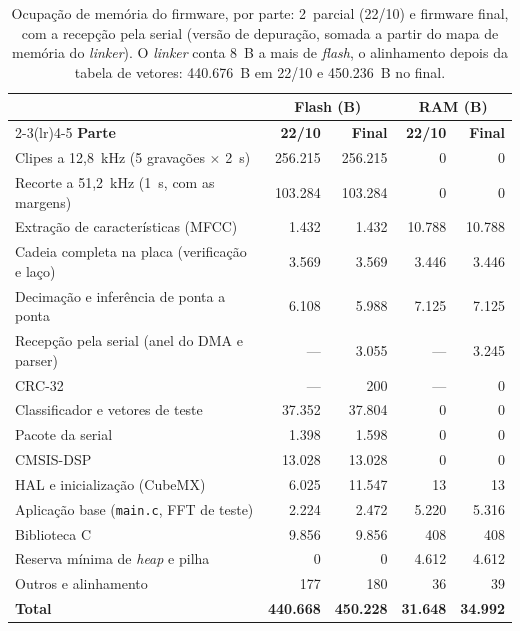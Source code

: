 \begin{table}[H]
\centering
\caption{Ocupação de memória do firmware, por parte: 2\textordmasculine\ parcial (22/10) e firmware final, com a recepção pela serial (versão de depuração, somada a partir do mapa de memória do \emph{linker}). O \emph{linker} conta 8~B a mais de \emph{flash}, o alinhamento depois da tabela de vetores: 440.676~B em 22/10 e 450.236~B no final.}
\label{tab:final_memoria}
\small
\begin{tabular}{lrrrr}
\toprule
 & \multicolumn{2}{c}{\textbf{Flash (B)}} & \multicolumn{2}{c}{\textbf{RAM (B)}} \\
\cmidrule(lr){2-3}\cmidrule(lr){4-5}
\textbf{Parte} & \textbf{22/10} & \textbf{Final} & \textbf{22/10} & \textbf{Final} \\
\midrule
Clipes a 12,8~kHz (5 gravações $\times$ 2~s) & 256.215 & 256.215 & 0 & 0 \\
Recorte a 51,2~kHz (1~s, com as margens) & 103.284 & 103.284 & 0 & 0 \\
Extração de características (MFCC) & 1.432 & 1.432 & 10.788 & 10.788 \\
Cadeia completa na placa (verificação e laço) & 3.569 & 3.569 & 3.446 & 3.446 \\
Decimação e inferência de ponta a ponta & 6.108 & 5.988 & 7.125 & 7.125 \\
Recepção pela serial (anel do DMA e parser) & --- & 3.055 & --- & 3.245 \\
CRC-32 & --- & 200 & --- & 0 \\
Classificador e vetores de teste & 37.352 & 37.804 & 0 & 0 \\
Pacote da serial & 1.398 & 1.598 & 0 & 0 \\
CMSIS-DSP & 13.028 & 13.028 & 0 & 0 \\
HAL e inicialização (CubeMX) & 6.025 & 11.547 & 13 & 13 \\
Aplicação base (\texttt{main.c}, FFT de teste) & 2.224 & 2.472 & 5.220 & 5.316 \\
Biblioteca C & 9.856 & 9.856 & 408 & 408 \\
Reserva mínima de \emph{heap} e pilha & 0 & 0 & 4.612 & 4.612 \\
Outros e alinhamento & 177 & 180 & 36 & 39 \\
\midrule
\textbf{Total} & \textbf{440.668} & \textbf{450.228} & \textbf{31.648} & \textbf{34.992} \\
\bottomrule
\end{tabular}
\end{table}

